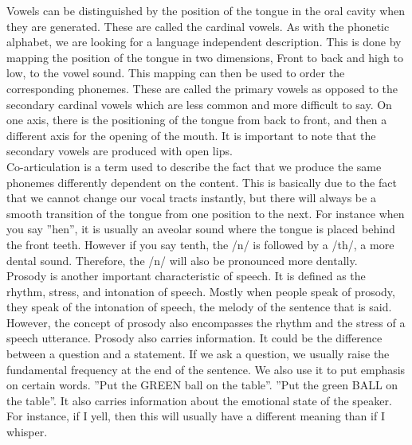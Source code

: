 Vowels can be distinguished by the position of the tongue in the oral cavity when they are generated.  These are called the cardinal vowels. As with the phonetic alphabet, we are looking for a language independent description. This is done by mapping the position of the tongue in two dimensions, Front to back and high to low, to the vowel sound.  This mapping can then be used to order the corresponding phonemes.  These are called the primary vowels as opposed to the secondary cardinal vowels which are less common and more difficult to say. On one axis, there is the positioning of the tongue from back to front, and then a different axis for the opening of the mouth. It is important to note that the secondary vowels are produced with open lips.\\

Co-articulation is a term used to describe the fact that we produce the same phonemes differently dependent on the content.  This is basically due to the fact that we cannot change our vocal tracts instantly, but there will always be a smooth transition of the tongue from one position to the next.  For instance when you say ''hen'',  it is usually an aveolar sound where the tongue is placed behind the front teeth. However if you say tenth, the /n/ is followed by a /th/, a more dental sound. Therefore, the /n/ will also be pronounced more dentally.  \\

Prosody is another important characteristic of speech.  It is defined as the rhythm, stress, and intonation of speech.  Mostly when people speak of prosody, they speak of the intonation of speech, the melody of the sentence that is said. However, the concept of prosody also encompasses the rhythm and the stress of a speech utterance. Prosody also carries information. It could be the difference between a question and a statement. If we ask a question, we usually raise the fundamental frequency at the end of the sentence.  We also use it to put emphasis on certain words. ''Put the GREEN ball on the table''.  ''Put the green BALL on the table''.  It also carries information about the emotional state of the speaker. For instance, if I yell, then this will usually have a different meaning than if I whisper.  

